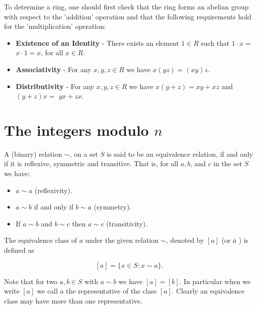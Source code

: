 \begin{itemize}
\end{itemize}

\begin{method}
  To determine a ring, one should first check that the ring forms an abelian group with respect to the 'addition' operation and that the following requirements hold for the 'multiplication' operation:

\begin{itemize}
   \item[i)] \textbf{Existence of an Identity} - There exists an element $1 \in R$ such that $1 \cdot x=$ $x \cdot 1=x$, for all $x \in R$.
  \item[ii)] \textbf{Associativity} - For any $x, y, z \in R$ we have $x(y z)=(x y) z$.
  \item[iii)] \textbf{Distributivity} - For any $x, y, z \in R$ we have $x(y+z)=x y+x z$ and $(y+z) x=$ $y x+z x$. 
\end{itemize}

\end{method}

\section{The integers modulo $n$}

\begin{definition}
  A (binary) relation $\sim$, on a set $S$ is said to be an equivalence relation, if and only if it is reflexive, symmetric and transitive. That is, for all $a, b$, and $c$ in the set $S$ we have:


  \begin{itemize}
\item[i)] $a \sim a$ (reflexivity).
\item[ii)] $a \sim b$ if and only if $b \sim a$ (symmetry).
\item[iii)] If $a \sim b$ and $b \sim c$ then $a \sim c$ (transitivity).
  \end{itemize}


\end{definition}

\begin{definition}
  The equivalence class of $a$ under the given relation $\sim$, denoted by $[a]$ (or $\bar{a}$ ) is defined as

$$
[a]=\{x \in S: x \sim a\} .
$$

Note that for two $a, b \in S$ with $a \sim b$ we have $[a]=[b]$. In particular when we write $[a]$ we call $a$ the representative of the class $[a]$. Clearly an equivalence class may have more than one representative.
\end{definition}

